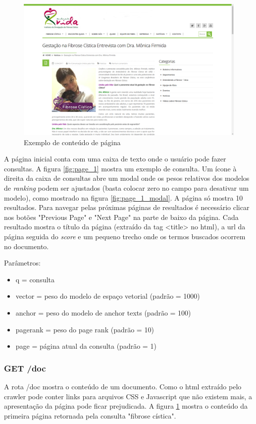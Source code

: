 \documentclass{article}
\begin{document}
\begin{figure}
\centering
\includegraphics[width=\linewidth]{doc.png}
\caption{Exemplo de conteúdo de página} 
\label{fig:doc}
\end{figure}

A página inicial conta com uma caixa de texto onde o usuário pode fazer consultas. A figura \ref{fig:page_1}
mostra um exemplo de consulta. 
Um ícone à direita da caixa de consultas abre um modal onde os pesos relativos dos modelos de \textit{ranking}
podem ser ajustados (basta colocar zero no campo para desativar um modelo), como mostrado na figura
\ref{fig:page_1_modal}. A página só mostra 
10 resultados. Para navegar pelas próximas páginas de resultados é necessário clicar nos botões
"Previous Page" e "Next Page" na parte de baixo da página.
Cada resultado mostra o título da página (extraído da tag <title> no html), a url da página 
seguida do \textit{score} e um pequeno trecho onde os termos buscados
ocorrem no documento.

Parâmetros: 
\begin{itemize}
  \item q = consulta
  \item vector = peso do modelo de espaço vetorial (padrão = 1000)
  \item anchor = peso do modelo de anchor texts (padrão = 100)
  \item pagerank = peso do page rank (padrão = 10)
  \item page = página atual da consulta (padrão = 1)
\end{itemize}

\subsubsection{GET /doc}
A rota /doc mostra o conteúdo de um documento. Como o html extraído pelo crawler pode conter links para
arquivos CSS e Javascript que não existem mais, a apresentação da página pode ficar prejudicada. A 
figura \ref{fig:doc} mostra o conteúdo da primeira página retornada pela consulta "fibrose cística". 
\end{document}
